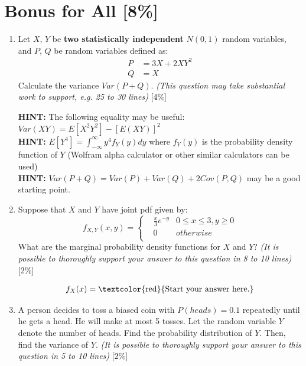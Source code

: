 \documentclass{article}
\begin{document}
\section{Bonus for All [8\%]}
\begin{enumerate}[label=(\alph*)]
    \item Let $X$, $Y$ be \textbf{two statistically independent} $N(0, 1)$ random variables, and $P$, $Q$ be random variables defined as: 
    \begin{align*}
        P &= 3X + 2XY^2 \\
        Q &= X
    \end{align*}
    Calculate the variance $Var(P + Q)$. \textit{(This question may take substantial work to support, e.g. 25 to 30 lines)} [4\%]
    
    \textbf{HINT:} The following equality may be useful: $Var(XY) = E[X^2Y^2] - [E(XY)]^2$ \\
    \textbf{HINT:} $E[Y^4] = \int_{-\infty}^{\infty}y^4 f_Y(y)dy$ where $f_Y(y)$ is the probability density function of $Y$ (Wolfram alpha calculator or other similar calculators can be used) \\
    \textbf{HINT:} $Var(P + Q) = Var(P) + Var(Q) + 2Cov(P, Q)$ may be a good starting point.
    
    \item Suppose that $X$ and $Y$ have joint pdf given by:
    $$f_{X,Y}(x,y)=\left\{
    \begin{aligned}
        &\frac{x}{3}e^{-y} & 0 \leq x \leq 3, y \geq 0 \\
        &0 & otherwise\\
    \end{aligned}\right.$$
    What are the marginal probability density functions for $X$ and  $Y$? \textit{(It is possible to thoroughly support your answer to this question in 8 to 10 lines)} [2\%]

    \begin{align*}
        f_X(x) &= \text{\textcolor{red}{Start your answer here.}} \\
    \end{align*}

    \item A person decides to toss a biased coin with $P(heads)=0.1$ repeatedly until he gets a head. He will make at most 5 tosses. Let the random variable $Y$ denote the number of heads. Find the probability distribution of $Y$. Then, find the variance of $Y$. \textit{(It is possible to thoroughly support your answer to this question in 5 to 10 lines)} [2\%]    
\end{enumerate}

\printbibliography
\end{document}
